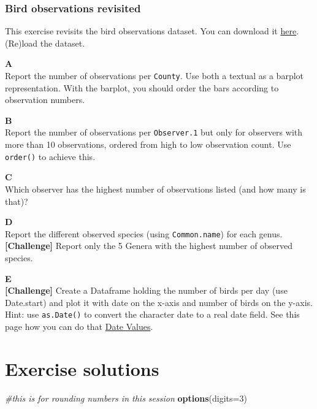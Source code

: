 \documentclass[]{book}
\newenvironment{Shaded}{\begin{snugshade}}{\end{snugshade}}
\newcommand{\CommentTok}[1]{\textcolor[rgb]{0.56,0.35,0.01}{\textit{#1}}}
\newcommand{\DataTypeTok}[1]{\textcolor[rgb]{0.13,0.29,0.53}{#1}}
\newcommand{\DecValTok}[1]{\textcolor[rgb]{0.00,0.00,0.81}{#1}}
\newcommand{\KeywordTok}[1]{\textcolor[rgb]{0.13,0.29,0.53}{\textbf{#1}}}
\newcommand{\NormalTok}[1]{#1}
\begin{document}
\hypertarget{bird-observations-revisited}{%
\subsection{Bird observations revisited}\label{bird-observations-revisited}}

This exercise revisits the bird observations dataset. You can download it \href{data/Observations-Data-2014.csv}{here}. (Re)load the dataset.

\textbf{A}\\
Report the number of observations per \texttt{County}. Use both a textual as a barplot representation. With the barplot, you should order the bars according to observation numbers.

\textbf{B}\\
Report the number of observations per \texttt{Observer.1} but only for observers with more than 10 observations, ordered from high to low observation count. Use \texttt{order()} to achieve this.

\textbf{C}\\
Which observer has the highest number of observations listed (and how many is that)?

\textbf{D}\\
Report the different observed species (using \texttt{Common.name}) for each genus. \textbf{{[}Challenge{]}} Report only the 5 Genera with the highest number of observed species.

\textbf{E}\\
\textbf{{[}Challenge{]}} Create a Dataframe holding the number of birds per day (use Date.start) and plot it with date on the x-axis and number of birds on the y-axis. Hint: use \texttt{as.Date()} to convert the character date to a real date field. See this page how you can do that \href{http://www.statmethods.net/input/dates.html}{Date Values}.

\hypertarget{exercise-solutions}{%
\chapter{Exercise solutions}\label{exercise-solutions}}

\begin{Shaded}
\begin{Highlighting}[]
\CommentTok{#this is for rounding numbers in this session}
\KeywordTok{options}\NormalTok{(}\DataTypeTok{digits=}\DecValTok{3}\NormalTok{)}
\end{Highlighting}
\end{Shaded}
\end{document}
